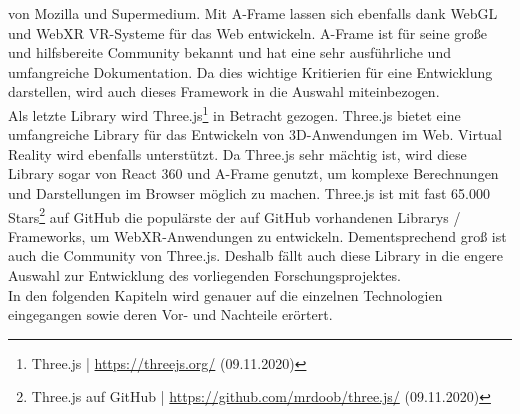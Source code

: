 \documentclass[a4paper,12pt,oneside]{article}
\begin{document}
      von Mozilla und Supermedium. Mit A-Frame lassen sich ebenfalls dank
      WebGL und WebXR VR-Systeme für das Web entwickeln. A-Frame ist für seine große und
      hilfsbereite Community bekannt und hat eine sehr ausführliche und umfangreiche
      Dokumentation. Da dies wichtige Kritierien für eine Entwicklung darstellen, 
      wird auch dieses Framework in die Auswahl miteinbezogen.\\
      Als letzte Library wird Three.js\footnote{Three.js | \url{https://threejs.org/} (09.11.2020)}
      in Betracht gezogen. Three.js bietet eine umfangreiche
      Library für das Entwickeln von 3D-Anwendungen im Web. Virtual Reality wird ebenfalls
      unterstützt. Da Three.js sehr mächtig ist, wird diese Library sogar von React 360
      und A-Frame genutzt, um komplexe Berechnungen und Darstellungen 
      im Browser möglich zu machen.
      Three.js ist mit fast 65.000 Stars\footnote{Three.js auf GitHub | \url{https://github.com/mrdoob/three.js/} (09.11.2020)}
      auf GitHub die populärste der auf GitHub 
      vorhandenen Librarys / Frameworks, um WebXR-Anwendungen zu entwickeln. Dementsprechend
      groß ist auch die Community von Three.js. Deshalb fällt auch diese Library in
      die engere Auswahl zur Entwicklung des vorliegenden Forschungsprojektes. \\
      In den folgenden Kapiteln wird genauer auf die einzelnen Technologien 
      eingegangen sowie deren Vor- und Nachteile erörtert.
\end{document}
